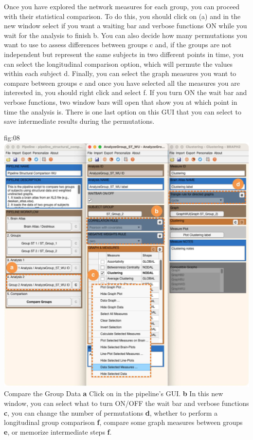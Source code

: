 \documentclass[justified]{tufte-handout}
\begin{document}
Once you have explored the network measures for each group, you can proceed with their statistical comparison. To do this, you should click on  (a) and in the new window select if you want a waiting bar and verbose functions ON while you wait for the analysis to finish {b}. You can also decide how many permutations you want to use to assess differences between groups {c} and, if the groups are not independent but represent the same subjects in two different points in time, you can select the longitudinal comparison option, which will permute the values within each subject {d}. Finally, you can select the graph measures you want to compare between groups {e} and once you have selected all the measures you are interested in, you should right click and select  {f}. If you turn ON the wait bar and verbose functions, two window bars will open that show you at which point in time the analysis is. There is one last option on this GUI that you can select to save intermediate results during the permutations.

	{fig:08}
	{
	\includegraphics{fig07.jpg}
	}
	{Compare the Group Data}
	{
	{\bf a} Click on  in the pipeline's GUI.
	{\bf b} In this new window, you can select what to turn ON/OFF the wait bar and verbose functions {\bf c}, you can change the number of permutations {\bf d}, whether to perform a longitudinal group comparison {\bf f}, compare some graph measures between groups {\bf e}, or memorize intermediate steps {\bf f}.
	}
\end{document}
